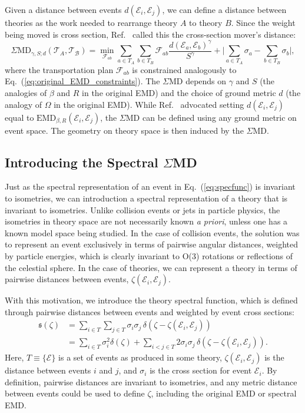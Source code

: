 \documentclass[letterpaper,11pt]{article}
\DeclareRobustCommand{\Eq}[1]{Eq.~(\ref{#1})}
\DeclareRobustCommand{\InRef}[1]{Ref.~\cite{#1}}
\begin{document}
Given a distance between events $d(\mathcal{E}_i, \mathcal{E}_j)$, we can define a distance between theories as the work needed to rearrange theory $A$ to theory $B$.
%
Since the weight being moved is cross section, \InRef{Komiske:2020qhg} called this the cross-section mover's distance:
%
\begin{equation}
\text{$\Sigma$MD}_{\gamma,S;d}(\mathcal{T}_A,\mathcal{T_B}) = \min_{\mathcal{F}_{ab}} \sum_{a \in T_A} \sum_{b \in T_B} \mathcal{F}_{ab} \frac{d(\mathcal{E}_a,\mathcal{E}_b)^\gamma}{S^\gamma} + \bigg| \sum_{a \in T_A} \sigma_a - \sum_{b \in T_B} \sigma_b  \bigg|,
\end{equation}
%
where the transportation plan $\mathcal{F}_{ab}$ is constrained analogously to \Eq{eq:original_EMD_constraints}.
%
The $\Sigma$MD depends on $\gamma$ and $S$ (the analogies of $\beta$ and $R$ in the original EMD) and the choice of ground metric $d$ (the analogy of $\Omega$ in the original EMD).
%
While \InRef{Komiske:2020qhg} advocated setting $d(\mathcal{E}_i, \mathcal{E}_j)$ equal to $\text{EMD}_{\beta,R}(\mathcal{E}_i, \mathcal{E}_j)$, the $\Sigma$MD can be defined using any ground metric on event space.
%
The geometry on theory space is then induced by the $\Sigma$MD.

\subsection{Introducing the Spectral $\Sigma$MD}

Just as the spectral representation of an event in \Eq{eq:specfunc} is invariant to isometries, we can introduction a spectral representation of a theory that is invariant to isometries.
%
Unlike collision events or jets in particle physics, the isometries in theory space are not necessarily known {\it a priori}, unless one has a known model space being studied.
%
In the case of collision events, the solution was to represent an event exclusively in terms of pairwise angular distances, weighted by particle energies, which is clearly invariant to O(3) rotations or reflections of the celestial sphere.
%
In the case of theories, we can represent a theory in terms of pairwise distances between events, $\zeta(\mathcal{E}_i, \mathcal{E}_j)$.


With this motivation, we introduce the theory spectral function, which is defined through pairwise distances between events and weighted by event cross sections:
%
\begin{align}
{\mathfrak s}(\zeta) &= \sum_{i\in T} \sum_{j\in T} \sigma_i\sigma_j\, \delta\left(
\zeta-\zeta(\mathcal{E}_i, \mathcal{E}_j)
\right)\\
&=\sum_{i\in T}\sigma_i^2\delta(\zeta)+\sum_{i<j\in T} 2\sigma_i\sigma_j\, \delta\left(
\zeta-\zeta(\mathcal{E}_i, \mathcal{E}_j)
\right).\nonumber
\end{align}
%
Here, $T \equiv \{\mathcal{E}\}$ is a set of events as produced in some theory, $\zeta(\mathcal{E}_i, \mathcal{E}_j)$ is the distance between events $i$ and $j$, and $\sigma_i$ is the cross section for event $\mathcal{E}_i$.
%
By definition, pairwise distances are invariant to isometries, and any metric distance between events could be used to define $\zeta$, including the original EMD or spectral EMD.
\end{document}
